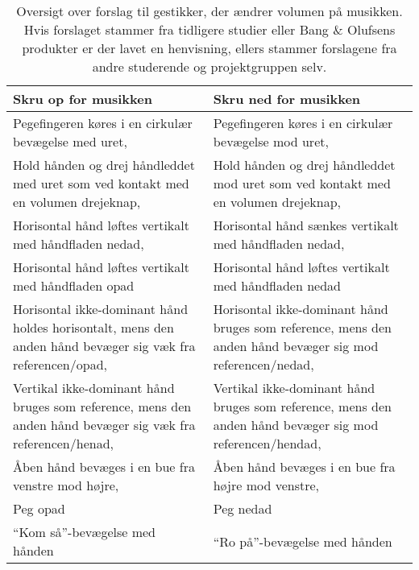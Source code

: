 \begin{table}[H]
	\centering
	\begin{tabular}{| p{6cm} | p{6cm} |}
		\hline
		\textbf{Skru op for musikken} & \textbf{Skru ned for musikken} \\ \hline
		Pegefingeren køres i en cirkulær bevægelse med uret, \parencite{WEB:BeosoundMoment, WEB:BMW7} & Pegefingeren køres i en cirkulær bevægelse mod uret, \parencite{WEB:BeosoundMoment, WEB:BMW7} \\ \hline
		Hold hånden og drej håndleddet med uret som ved kontakt med en volumen drejeknap, \parencite{WEB:Beosound2} & Hold hånden og drej håndleddet mod uret som ved kontakt med en volumen drejeknap, \parencite{WEB:Beosound2} \\ \hline
		Horisontal hånd løftes vertikalt med håndfladen nedad, \parencite[s. 166]{PDF:ComparingInputModalities} & Horisontal hånd sænkes vertikalt med håndfladen nedad, \parencite[s. 166]{PDF:ComparingInputModalities} \\ \hline
		Horisontal hånd løftes vertikalt med håndfladen opad & Horisontal hånd løftes vertikalt med håndfladen nedad \\ \hline
		Horisontal ikke-dominant hånd holdes horisontalt, mens den anden hånd bevæger sig væk fra referencen/opad, \parencite[s. 48]{PDF:UserDefinedGesturesTV} & Horisontal ikke-dominant hånd bruges som reference, mens den anden hånd bevæger sig mod referencen/nedad, \parencite[s. 48]{PDF:UserDefinedGesturesTV} \\ \hline
		Vertikal ikke-dominant hånd bruges som reference, mens den anden hånd bevæger sig væk fra referencen/henad, \parencite[s. 48]{PDF:UserDefinedGesturesTV} & Vertikal ikke-dominant hånd bruges som reference, mens den anden hånd bevæger sig mod referencen/hendad, \parencite[s. 48]{PDF:UserDefinedGesturesTV} \\ \hline
		Åben hånd bevæges i en bue fra venstre mod højre, \parencite{WEB:BeoplayA9} & Åben hånd bevæges i en bue fra højre mod venstre, \parencite{WEB:BeoplayA9} \\ \hline
		Peg opad & Peg nedad \\ \hline
		\enquote{Kom så}-bevægelse med hånden & \enquote{Ro på}-bevægelse med hånden \\ \hline		
		
	\end{tabular}
	\caption{Oversigt over forslag til gestikker, der ændrer volumen på musikken. Hvis forslaget stammer fra tidligere studier eller Bang $\&$ Olufsens produkter er der lavet en henvisning, ellers stammer forslagene fra andre studerende og projektgruppen selv.}
	\label{tab:IndsamledeGestikkerVolumen}
\end{table}
\noindent

